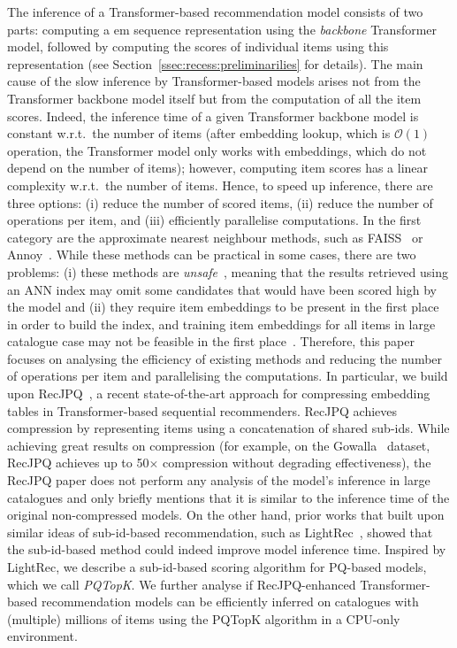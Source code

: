 \documentclass[sigconf,natbib=true, review=False]{acmart} %
\newcommand{\pageenlarge}[1]{\marginnote{#1}\enlargethispage{#1\baselineskip}}
\newcommand{\rsasha}[1]{\textcolor[HTML]{000000}{#1}}
\newcommand{\scr}[1]{\textcolor[HTML]{000000}{#1}}
\newcommand{\scrc}[1]{\textcolor[HTML]{000000}{#1}}
\begin{document}
 \scrc{The inference of a Transformer-based recommendation model consists of two parts: computing a {em sequence representation} using the \emph{backbone} Transformer model, followed by computing the scores of individual items using this representation (see Section~\ref{ssec:recess:preliminarilies} for details).} The main cause of the slow inference by Transformer-based models arises not from the Transformer backbone model itself but from the computation of \scrc{all the item scores}. Indeed, the inference time of a given Transformer backbone model is constant w.r.t.\ the number of items \rsasha{(after embedding lookup, which is $\mathcal{O}(1)$ operation, the Transformer model only works with embeddings, which do not depend on the number of items)}; however, computing item scores has a linear complexity w.r.t.\ the number of items. Hence, to speed up inference, there are three options: (i) reduce the number of scored items, (ii) reduce the number of operations per item, and (iii) efficiently parallelise computations. 
%
In the first category are the approximate nearest neighbour methods, such as FAISS~\cite{FAISS} or Annoy~\cite{SpotifyAnnoy2024}. While these methods can be practical in some cases, there are two problems: (i) these methods are \scrc{\emph{unsafe}~\cite{turtleQueryEvaluationStrategies1995b,tonellottoEfficientQueryProcessing2018}}, meaning that the results retrieved using an ANN index may omit some candidates that would have been scored high by the model and (ii) they require item embeddings to be present in the first place in order to build the index, and training item embeddings for all items in large catalogue case may not be feasible in the first place~\cite{petrovRecJPQTrainingLargeCatalogue2024}.
%
Therefore, this paper focuses on \scr{analysing the efficiency of existing methods and} reducing the number of operations per item and parallelising the computations. In particular, we build upon RecJPQ~\cite{petrovRecJPQTrainingLargeCatalogue2024}, a recent state-of-the-art approach for compressing embedding tables in Transformer-based sequential recommenders. RecJPQ achieves compression by representing items using a concatenation of shared sub-ids. While achieving great results on compression (for example, on the Gowalla~\cite{choFriendshipMobilityUser2011} dataset, RecJPQ achieves up to 50$\times$ compression without degrading effectiveness), the RecJPQ paper does not perform any analysis of the model's inference in large catalogues and only briefly mentions that it is similar to the inference time of the original non-compressed models. On the other hand, prior works that built upon similar ideas of sub-id-based recommendation, such as LightRec~\cite{lianLightRecMemorySearchEfficient2020}, showed that the sub-id-based method could indeed improve model inference time. \rsasha{Inspired by LightRec, we describe a sub-id-based scoring algorithm for PQ-based models, which we call \textit{PQTopK}.} \scr{We further} analyse if RecJPQ-enhanced Transformer-based recommendation models can be efficiently inferred on catalogues with (multiple) millions of items using the PQTopK algorithm in a CPU-only environment. 
\end{document}
